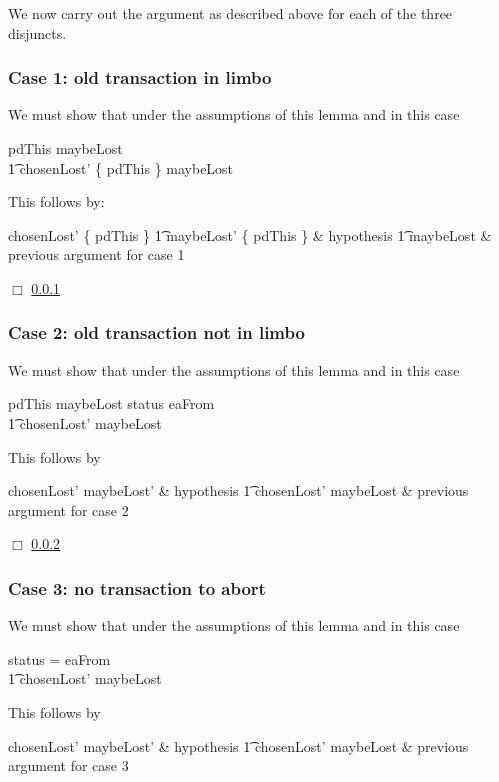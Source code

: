 We now carry out the argument as described above for each of the
three disjuncts.

\subsubsection{Case 1: old transaction in limbo}
\label{abort-exists-inlimbo}

We must show that under the assumptions of this lemma and in this
case

\begin{gzed}
  pdThis \in maybeLost \implies
  \\ %
  \t1 chosenLost' \cup \{ pdThis \} \subseteq maybeLost
\end{gzed}
This follows by:
\begin{argue}
  chosenLost' \cup \{ pdThis \}
  \also %
  \t1 \subseteq maybeLost' \cup \{ pdThis \} & hypothesis
  \also %
  \t1 \subseteq maybeLost & previous argument for case 1
\end{argue}

$\Box$ \ref{abort-exists-inlimbo}
\subsubsection{Case 2: old transaction not in limbo}
\label{abort-exists-not-inlimbo}
We must show that under the assumptions of this lemma and in this
case
\begin{gzed}
  pdThis \notin maybeLost \land status \neq eaFrom \implies
  \\ %
  \t1 chosenLost' \subseteq maybeLost
\end{gzed}
This follows by
\begin{argue}
  chosenLost' \subseteq maybeLost'        & hypothesis
  \also %
  \t1 \implies chosenLost' \subseteq maybeLost & previous argument for
  case 2
\end{argue}

$\Box$ \ref{abort-exists-not-inlimbo}
\subsubsection{Case 3: no transaction to abort}
\label{abort-exists-no-transaction}
We must show that under the assumptions of this lemma and in this
case
\begin{gzed}
  status = eaFrom \implies
  \\ %
  \t1 chosenLost' \subseteq maybeLost
\end{gzed}
This follows by
\begin{argue}
  chosenLost' \subseteq maybeLost' & hypothesis
  \also %
  \t1 \implies chosenLost' \subseteq maybeLost & previous argument for
  case 3
\end{argue}

